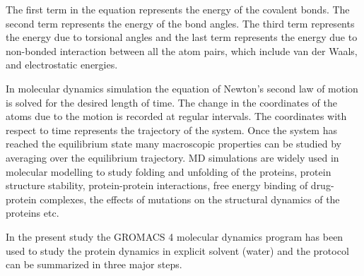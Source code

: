 		The first term in the equation represents the energy of the covalent bonds. The second term represents the energy of the bond angles. The third term represents the energy due to torsional angles and the last term represents the energy due to non-bonded interaction between all the atom pairs, which include van der Waals, and electrostatic energies. 
		
		In molecular dynamics simulation the equation of Newton's second law of motion is solved for the desired length of time. %
		The change in the coordinates of the atoms due to the motion is recorded at regular intervals. The coordinates with respect to time represents the trajectory of the system. Once the system has reached the equilibrium state many macroscopic properties can be studied by averaging over the equilibrium trajectory. MD simulations are widely used in molecular modelling to study folding and unfolding of the proteins, protein structure stability, protein-protein interactions, free energy binding of drug-protein complexes, the effects of mutations on the structural dynamics of the proteins etc. 
		
		In the present study the GROMACS 4 \parencite{Pronk2013} molecular dynamics program has been used to study the protein dynamics in explicit solvent (water) and the protocol can be summarized in three major steps. 
		
